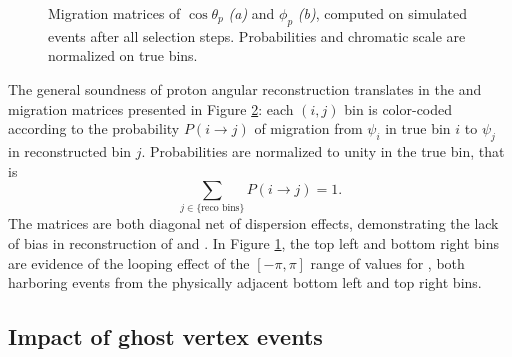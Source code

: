 \begin{figure}[t]
\begin{subfigure}{.45\textwidth}
		\caption{}
		\label{fig:5:MCRECO_p_phi_migration}
	\end{subfigure}
	\caption{Migration matrices of $\cos\theta_p$ \textit{(a)} and $\phi_p$ \textit{(b)}, computed on simulated \demonstratorshort events after all selection steps. Probabilities and chromatic scale are normalized on true bins.}
	\label{fig:5:angular_migration_matrices}
\end{figure}

The general soundness of proton angular reconstruction translates in the \cthetap and \phip migration matrices presented in Figure \ref{fig:5:angular_migration_matrices}:
each $(i,j)$ bin is color-coded according to the probability $P(i \rightarrow j)$ of migration from $\psi_i$ in true bin $i$ to $\psi_j$ in reconstructed bin $j$. Probabilities are normalized to unity in the true bin, that is
\begin{equation}
	\sum_{j \in \{ \text{reco bins} \}} P(i\rightarrow j) = 1.
\end{equation}
The matrices are both diagonal net of dispersion effects, demonstrating the lack of bias in reconstruction of \cthetap and \phip.
In Figure \ref{fig:5:MCRECO_p_phi_migration}, the top left and bottom right bins are evidence of the looping effect of the $[-\pi,\pi]$ range of values for \phip, both harboring events from the physically adjacent bottom left and top right bins.

\subsection{Impact of ghost vertex events}
\label{sec:5:resolution_after_ghost}

